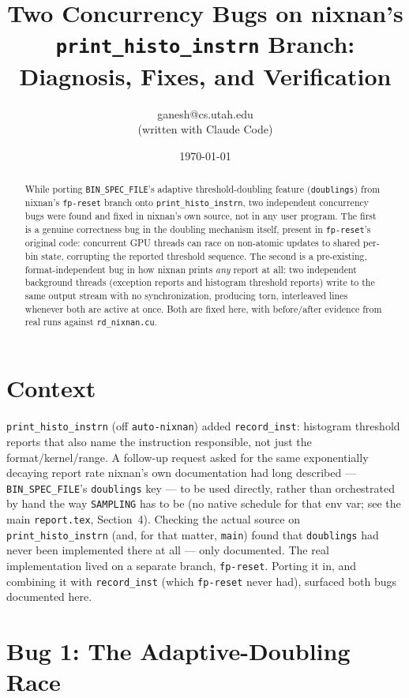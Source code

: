 \documentclass[11pt]{article}
\title{Two Concurrency Bugs on nixnan's \texttt{print\_histo\_instrn} Branch:\\
Diagnosis, Fixes, and Verification}
\author{ganesh@cs.utah.edu \\ \small (written with Claude Code)}
\date{\today}
\begin{document}
\maketitle

\begin{abstract}
While porting \texttt{BIN\_SPEC\_FILE}'s adaptive threshold-doubling feature
(\texttt{doublings}) from nixnan's \texttt{fp-reset} branch onto \texttt{print\_histo\_instrn},
two independent concurrency bugs were found and fixed in nixnan's own source, not in any
user program. The first is a genuine correctness bug in the doubling mechanism itself,
present in \texttt{fp-reset}'s original code: concurrent GPU threads can race on
non-atomic updates to shared per-bin state, corrupting the reported threshold sequence.
The second is a pre-existing, format-independent bug in how nixnan prints \emph{any}
report at all: two independent background threads (exception reports and histogram
threshold reports) write to the same output stream with no synchronization, producing
torn, interleaved lines whenever both are active at once. Both are fixed here, with
before/after evidence from real runs against \texttt{rd\_nixnan.cu}.
\end{abstract}

\tableofcontents

\section{Context}

\texttt{print\_histo\_instrn} (off \texttt{auto-nixnan}) added \texttt{record\_inst}:
histogram threshold reports that also name the instruction responsible, not just the
format/kernel/range. A follow-up request asked for the same exponentially decaying
report rate nixnan's own documentation had long described --- \texttt{BIN\_SPEC\_FILE}'s
\texttt{doublings} key --- to be used directly, rather than orchestrated by hand the way
\texttt{SAMPLING} has to be (no native schedule for that env var; see the main
\texttt{report.tex}, Section~4). Checking the actual source on \texttt{print\_histo\_instrn}
(and, for that matter, \texttt{main}) found that \texttt{doublings} had never been
implemented there at all --- only documented. The real implementation lived on a
separate branch, \texttt{fp-reset}. Porting it in, and combining it with
\texttt{record\_inst} (which \texttt{fp-reset} never had), surfaced both bugs documented
here.

\section{Bug 1: The Adaptive-Doubling Race}
\label{sec:doubling-race}
\end{document}
